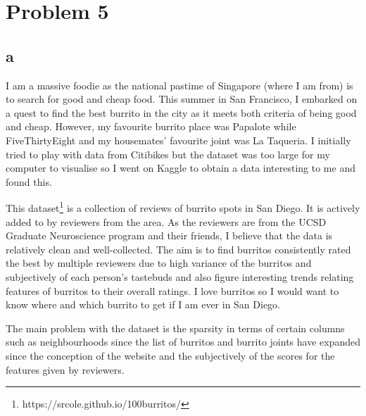 \documentclass[twoside]{homework}
\begin{document}
\section*{Problem 5}
\subsection*{a}
I am a massive foodie as the national pastime of Singapore (where I am from) is to search for good and cheap food. This summer in San Francisco, I embarked on a quest to find the best burrito in the city as it meets both criteria of being good and cheap. However, my favourite burrito place was Papalote while FiveThirtyEight and my housemates' favourite joint was La Taqueria. I initially tried to play with data from Citibikes but the dataset was too large for my computer to visualise so I went on Kaggle to obtain a data interesting to me and found this.

This dataset\footnote{https://srcole.github.io/100burritos/} is a collection of reviews of burrito spots in San Diego. It is actively added to by reviewers from the area. As the reviewers are from the UCSD Graduate Neuroscience program and their friends, I believe that the data is relatively clean and well-collected. The aim is to find burritos consistently rated the best by multiple reviewers due to high variance of the burritos and subjectively of each person's tastebuds and also figure interesting trends relating features of burritos to their overall ratings. I love burritos so I would want to know where and which burrito to get if I am ever in San Diego.

The main problem with the dataset is the sparsity in terms of certain columns such as neighbourhoods since the list of burritos and burrito joints have expanded since the conception of the website and the subjectively of the scores for the features given by reviewers.
\end{document}

